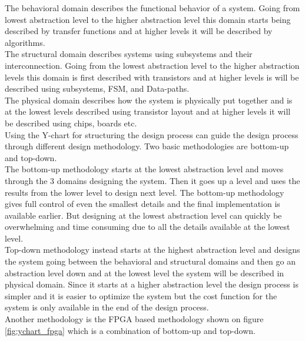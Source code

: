 The behavioral domain describes the functional behavior of a system. Going from lowest abstraction level to the higher abstraction level this domain starts being described by transfer functions and at higher levels it will be described by algorithms.\\
The structural domain describes systems using subsystems and their interconnection. Going from the lowest abstraction level to the higher abstraction levels this domain is first described with transistors and at higher levels is will be described using subsystems, FSM, and Data-paths.\\
The physical domain describes how the system is physically put together and is at the lowest levels described using transistor layout and at higher levels it will be described using chips, boards etc.\\

Using the Y-chart for structuring the design process can guide the design process through different design methodology. Two basic methodologies are bottom-up and top-down. \\
The bottom-up methodology starts at the lowest abstraction level and moves through the 3 domains designing the system. Then it goes up a level and uses the results from the lower level to design next level. The bottom-up methodology gives full control of even the smallest details and the final implementation is available earlier. But designing at the lowest abstraction level can quickly be overwhelming and time consuming due to all the details available at the lowest level.\\
Top-down methodology instead starts at the highest abstraction level and designs the system going between the behavioral and structural domains and then go an abstraction level down and at the lowest level the system will be described in physical domain. Since it starts at a higher abstraction level the design process is simpler and it is easier to optimize the system but the cost function for the system is only available in the end of the design process.\\

Another methodology is the FPGA based methodology shown on figure \vref{fig:ychart_fpga} which is a combination of bottom-up and top-down.

